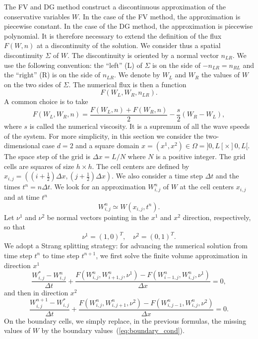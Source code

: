 \documentclass[12pt]{amsart}
\begin{document}
The FV and DG method construct a discontinuous approximation of the conservative variables $W$. In the case of the FV method, the approximation is piecewise constant. In the case of the DG method, the approximation is piecewise polynomial. It is therefore necessary to extend the definition of the flux $F(W,n)$ at a discontinuity of the solution. We consider thus a spatial discontinuity $\Sigma$ of $W$. The discontinuity is oriented by a normal vector $n_{LR}$. We use the following convention: the ``left'' (L) of $\Sigma$ is on the side of $-n_{LR}=n_{RL}$ and the ``right'' (R) is on the side of $n_{LR}$. We denote by $W_L$ and $W_R$ the values of $W$ on the two sides of $\Sigma$. The numerical flux is then a function $$F(W_L,W_R,n_{LR}).$$
A common choice is to take
\begin{equation*}
F(W_L,W_R,n)=\frac{F(W_L,n)+F(W_R,n)}{2}-\frac{s}{2}(W_R-W_L),
\end{equation*}
where $s$ is called the numerical viscosity. It is a supremum of all the wave speeds of the system.
For more simplicity, in this section we consider the two-dimensional case $d=2$ and a square domain $x=(x^1,x^2)\in \Omega=]0,L[\times]0,L[$. The space step of the grid is $\Delta x=L/N$ where $N$ is a positive integer. The grid cells are squares of size $h\times h$. The cell centers are defined by $x_{i,j}=((i+\frac{1}{2})\Delta x,(j+\frac{1}{2})\Delta x)$. We also consider a time step $\Delta t$ and the times $t^n=n\Delta t$. We look for an approximation $W^n_{i,j}$ of $W$  at the cell centers $x_{i,j}$ and at time $t^n$
\begin{equation}
W^n_{i,j}\simeq W(x_{i,j},t^n).
\end{equation}
Let $\nu^1$ and $\nu^2$ be normal vectors pointing in the $x^1$ and $x^2$ direction, respectively, so that
$$
\nu^1=(1,0)^T,\quad \nu^2=(0,1)^T.
$$
We adopt a Strang splitting strategy: for advancing the numerical solution from time step $t^n$ to time step $t^{n+1}$, we first solve the finite volume approximation in direction $x^1$
\begin{equation}
\frac{W_{i,j}^{*}-W_{i,j}^{n}}{\Delta t}+\frac{F(W^n_{i,j},W^n_{i+1,j},\nu^1)-F(W^n_{i-1,j},W^n_{i,j},\nu^1)}{\Delta x}=0,
\label{eq:x-step}
\end{equation}
and then in direction $x^2$
\begin{equation}
\frac{W_{i,j}^{n+1}-W_{i,j}^{*}}{\Delta t}+\frac{F(W^n_{i,j},W^n_{i,j+1},\nu^2)-F(W^n_{i,j-1},W^n_{i,j},\nu^2)}{\Delta x}=0.
\label{eq:y-step}
\end{equation}
On the boundary cells, we simply replace, in the previous formulas, the missing values of $W$ by the boundary values~(\ref{eq:boundary_cond}).
\end{document}
